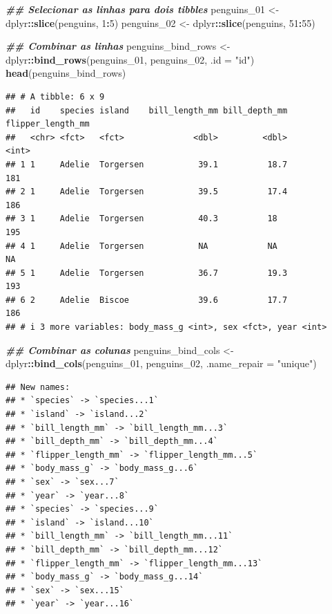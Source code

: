 \documentclass[
]{article}
\newenvironment{Shaded}{\begin{snugshade}}{\end{snugshade}}
\newcommand{\AttributeTok}[1]{\textcolor[rgb]{0.13,0.29,0.53}{#1}}
\newcommand{\DecValTok}[1]{\textcolor[rgb]{0.00,0.00,0.81}{#1}}
\newcommand{\DocumentationTok}[1]{\textcolor[rgb]{0.56,0.35,0.01}{\textbf{\textit{#1}}}}
\newcommand{\FunctionTok}[1]{\textcolor[rgb]{0.13,0.29,0.53}{\textbf{#1}}}
\newcommand{\NormalTok}[1]{#1}
\newcommand{\OtherTok}[1]{\textcolor[rgb]{0.56,0.35,0.01}{#1}}
\newcommand{\SpecialCharTok}[1]{\textcolor[rgb]{0.81,0.36,0.00}{\textbf{#1}}}
\newcommand{\StringTok}[1]{\textcolor[rgb]{0.31,0.60,0.02}{#1}}
\begin{document}
\begin{Shaded}
\begin{Highlighting}[]
\DocumentationTok{\#\# Selecionar as linhas para dois tibbles}
\NormalTok{penguins\_01 }\OtherTok{\textless{}{-}}\NormalTok{ dplyr}\SpecialCharTok{::}\FunctionTok{slice}\NormalTok{(penguins, }\DecValTok{1}\SpecialCharTok{:}\DecValTok{5}\NormalTok{)}
\NormalTok{penguins\_02 }\OtherTok{\textless{}{-}}\NormalTok{ dplyr}\SpecialCharTok{::}\FunctionTok{slice}\NormalTok{(penguins, }\DecValTok{51}\SpecialCharTok{:}\DecValTok{55}\NormalTok{)}

\DocumentationTok{\#\# Combinar as linhas}
\NormalTok{penguins\_bind\_rows }\OtherTok{\textless{}{-}}\NormalTok{ dplyr}\SpecialCharTok{::}\FunctionTok{bind\_rows}\NormalTok{(penguins\_01, penguins\_02, }\AttributeTok{.id =} \StringTok{"id"}\NormalTok{)}
\FunctionTok{head}\NormalTok{(penguins\_bind\_rows)}
\end{Highlighting}
\end{Shaded}

\begin{verbatim}
## # A tibble: 6 x 9
##   id    species island    bill_length_mm bill_depth_mm flipper_length_mm
##   <chr> <fct>   <fct>              <dbl>         <dbl>             <int>
## 1 1     Adelie  Torgersen           39.1          18.7               181
## 2 1     Adelie  Torgersen           39.5          17.4               186
## 3 1     Adelie  Torgersen           40.3          18                 195
## 4 1     Adelie  Torgersen           NA            NA                  NA
## 5 1     Adelie  Torgersen           36.7          19.3               193
## 6 2     Adelie  Biscoe              39.6          17.7               186
## # i 3 more variables: body_mass_g <int>, sex <fct>, year <int>
\end{verbatim}

\begin{Shaded}
\begin{Highlighting}[]
\DocumentationTok{\#\# Combinar as colunas}
\NormalTok{penguins\_bind\_cols }\OtherTok{\textless{}{-}}\NormalTok{ dplyr}\SpecialCharTok{::}\FunctionTok{bind\_cols}\NormalTok{(penguins\_01, penguins\_02, }\AttributeTok{.name\_repair =} \StringTok{"unique"}\NormalTok{)}
\end{Highlighting}
\end{Shaded}

\begin{verbatim}
## New names:
## * `species` -> `species...1`
## * `island` -> `island...2`
## * `bill_length_mm` -> `bill_length_mm...3`
## * `bill_depth_mm` -> `bill_depth_mm...4`
## * `flipper_length_mm` -> `flipper_length_mm...5`
## * `body_mass_g` -> `body_mass_g...6`
## * `sex` -> `sex...7`
## * `year` -> `year...8`
## * `species` -> `species...9`
## * `island` -> `island...10`
## * `bill_length_mm` -> `bill_length_mm...11`
## * `bill_depth_mm` -> `bill_depth_mm...12`
## * `flipper_length_mm` -> `flipper_length_mm...13`
## * `body_mass_g` -> `body_mass_g...14`
## * `sex` -> `sex...15`
## * `year` -> `year...16`
\end{verbatim}
\end{document}
